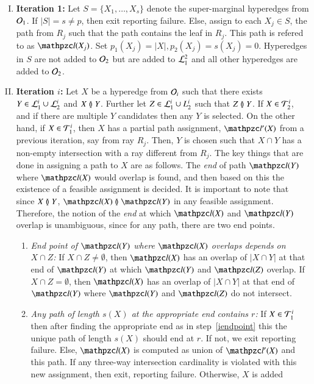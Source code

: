 \documentclass[MS,]{iitmdiss}
\begin{document}
\begin{enumerate}[I.]
\item {\bf Iteration 1:} Let $S=\{X_1,\ldots,X_s\}$ denote the
  super-marginal hyperedges from ${\cal O}_1$.  If $|S|=s \neq p$, then
  exit reporting failure.  Else, assign to each $X_j \in S$, the path
  from $R_j$ such that the path contains the leaf in $R_j$.  This path
  is refered to as $\cl(X_j)$.  Set $p_1(X_j)=|X|, p_2(X_j)=s(X_j)=0$.
  Hyperedges in $S$ are not added to ${\cal O}_2$ but are added to
  ${\cal L}_1^2$ and all other hyperedges are added to
  ${\cal O}_2$.
\item {\bf Iteration $i$:} Let $X$ be a hyperedge from ${\cal O}_i$ such
  that there exists $Y \in {\cal L}_1^i \cup {\cal L}_2^i$ and $X \between
  Y$. Further let $Z \in {\cal L}_1^i \cup L_2^i$ such that $Z \between Y$.
  If $X \in {\cal T}_2^i$, and if there are multiple $Y$ candidates then
  any $Y$ is selected.  On the other hand, if $X \in {\cal T}_1^i$, then
  $X$ has a partial path assignment, $\cl'(X)$ from a previous
  iteration, say from ray $R_j$. Then, $Y$ is
  chosen such that $X \cap Y$ has a non-empty intersection with a ray
  different from $R_j$.  The key things that are done in assigning a
  path to $X$ are as follows. The {\em end} of path $\cl(Y)$ where
  $\cl(X)$ would overlap is found, and then based on this the
  existence of a feasible assignment is decided.  It is important to
  note that since $X \between Y$, $\cl(X) \overlap \cl(Y)$ in any
  feasible assignment.  Therefore, the notion of the {\em end} at
  which $\cl(X)$ and $\cl(Y)$ overlap is unambiguous, since for any
  path, there are two end points.
  \begin{enumerate}
  \item \label{iendpoint} {\em End point of $\cl(Y)$ where $\cl(X)$ overlaps
      depends on $X \cap Z$:} If $X \cap Z
    \neq \emptyset$, then $\cl(X)$ has an overlap of $|X \cap Y|$ at that
    end of $\cl(Y)$ at which $\cl(Y)$ and $\cl(Z)$ overlap.  If $X
    \cap Z = \emptyset$, then $\cl(X)$ has an overlap of $|X \cap Y|$ at
    that end of $\cl(Y)$ where $\cl(Y)$ and $\cl(Z)$ do not intersect.
  \item {\em Any path of length $s(X)$ at the appropriate end contains
      $r$:} If $X \in {\cal T}_1^i$ then after finding the appropriate end
    as in step~\ref{iendpoint} this the unique path of length $s(X)$
    should end at $r$.  If not, we exit reporting failure.  Else,
    $\cl(X)$ is computed as union of $\cl'(X)$ and this path. If any
    three-way intersection cardinality is violated with this new
    assignment, then exit, reporting failure.  Otherwise, $X$ is added

\end{enumerate}
\end{enumerate}
\end{document}
